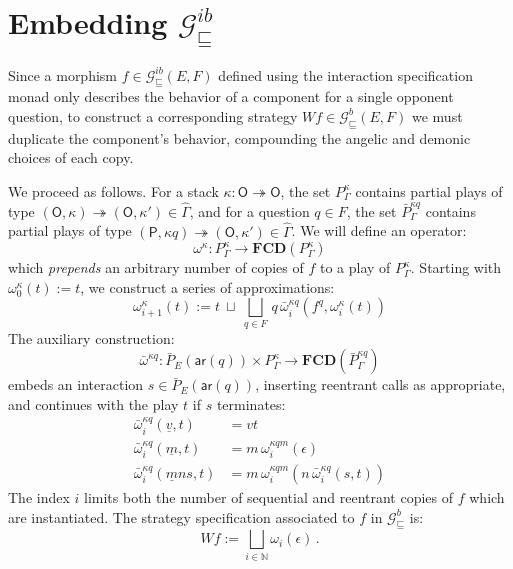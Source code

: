 \documentclass[draft,11pt]{report}
\theoremstyle{definition}
\newcommand{\gcat}{\mathcal{G}_{\sqsubseteq}}
\newcommand{\kw}[1]{\ensuremath{ \mathsf{#1} }}
\begin{document}

\section{Embedding $\gcat^{ib}$} \label{sec:gamesem:emb} %

Since a morphism $f \in \gcat^{ib}(E,F)$
defined using the interaction specification monad
only describes the behavior of a component
for a single opponent question,
to construct a corresponding strategy $W f \in \gcat^b(E,F)$
we must duplicate the component's behavior,
compounding the angelic and demonic choices of each copy.

We proceed as follows.
For a stack
$\kappa : \kw{O} \twoheadrightarrow \kw{O}$,
the set $P^\kappa_\Gamma$ contains
partial plays of type
$(\kw{O}, \kappa) \twoheadrightarrow (\kw{O}, \kappa')
 \in \hat{\Gamma}$,
and for a question $q \in F$,
the set $\bar{P}^{\kappa q}_\Gamma$ contains
partial plays of type
$(\kw{P}, \kappa q) \twoheadrightarrow (\kw{O}, \kappa')
 \in \hat{\Gamma}$.
We will define an operator:
\[
  \omega^\kappa :
    P^\kappa_\Gamma \rightarrow
    \mathbf{FCD}(P^\kappa_\Gamma)
\]
which \emph{prepends} an arbitrary number of copies of $f$
to a play of $P^\kappa_\Gamma$.
Starting with 
$\omega^\kappa_0(t) := t$,
we construct a series of approximations:
\[
  \omega^\kappa_{i+1}(t) :=
    t \: \sqcup \:
    \bigsqcup_{q \in F} \,
      q \, \bar{\omega}^{\kappa q}_i(f^q, \omega^\kappa_i(t))
\]
The auxiliary construction:
\[
  \bar{\omega}^{\kappa q} :
    \bar{P}_E(\kw{ar}(q)) \times P^{\kappa}_\Gamma \rightarrow
    \mathbf{FCD}(\bar{P}^{\kappa q}_\Gamma)
\]
embeds an interaction $s \in \bar{P}_E(\kw{ar}(q))$,
inserting reentrant calls as appropriate,
and continues with the play $t$
if $s$ terminates:
\begin{align*}
  \bar{\omega}^{\kappa q}_i(\underline v, t) &=
    v t
  \\
  \bar{\omega}^{\kappa q}_i(\underline m, t) &=
    m \, \omega^{\kappa q m}_i(\epsilon)
  \\
  \bar{\omega}^{\kappa q}_i(\underline m n s, t) &=
    m \, \omega^{\kappa q m}_i(n \, \bar{\omega}^{\kappa q}_i(s, t))
\end{align*}
The index $i$ limits both the number of
sequential and reentrant copies of $f$
which are instantiated.
The strategy specification associated to $f$
in $\gcat^{b}$ is:
\[
    W f := \bigsqcup_{i \in \mathbb{N}} \omega_i(\epsilon) \,.
\]

\end{document}
